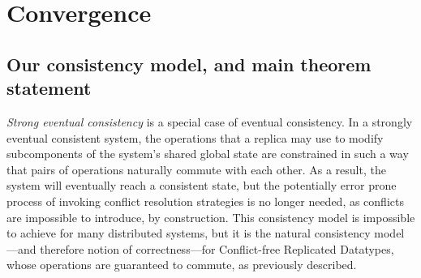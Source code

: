\documentclass[acmlarge,review,anonymous]{acmart}\settopmatter{printfolios=true}
\begin{document}
\section{Convergence}
\label{sect.convergence}

\subsection{Our consistency model, and main theorem statement}
\label{subsect.consistency.model.main.theorem.statement}

\emph{Strong eventual consistency} is a special case of eventual consistency.
In a strongly eventual consistent system, the operations that a replica may use to modify subcomponents of the system's shared global state are constrained in such a way that pairs of operations naturally commute with each other.
As a result, the system will eventually reach a consistent state, but the potentially error prone process of invoking conflict resolution strategies is no longer needed, as conflicts are impossible to introduce, by construction.
This consistency model is impossible to achieve for many distributed systems, but it is the natural consistency model---and therefore notion of correctness---for Conflict-free Replicated Datatypes, whose operations are guaranteed to commute, as previously described.
\end{document}
